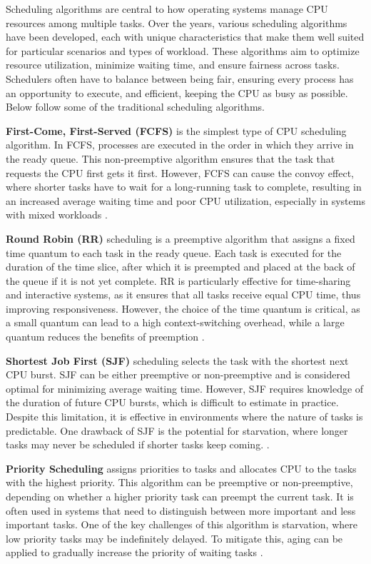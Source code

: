 Scheduling algorithms are central to how operating systems manage CPU resources among multiple tasks. Over the years, various scheduling algorithms have been developed, each with unique characteristics that make them well suited for particular scenarios and types of workload. These algorithms aim to optimize resource utilization, minimize waiting time, and ensure fairness across tasks. Schedulers often have to balance between being fair, ensuring every process has an opportunity to execute, and efficient, keeping the CPU as busy as possible. Below follow some of the traditional scheduling algorithms.

\textbf{First-Come, First-Served (FCFS)} is the simplest type of CPU scheduling algorithm. In FCFS, processes are executed in the order in which they arrive in the ready queue. This non-preemptive algorithm ensures that the task that requests the CPU first gets it first. However, FCFS can cause the convoy effect, where shorter tasks have to wait for a long-running task to complete, resulting in an increased average waiting time and poor CPU utilization, especially in systems with mixed workloads \cite{silberschatz2018, tanenbaum2015}.

\textbf{Round Robin (RR)} scheduling is a preemptive algorithm that assigns a fixed time quantum to each task in the ready queue. Each task is executed for the duration of the time slice, after which it is preempted and placed at the back of the queue if it is not yet complete. RR is particularly effective for time-sharing and interactive systems, as it ensures that all tasks receive equal CPU time, thus improving responsiveness. However, the choice of the time quantum is critical, as a small quantum can lead to a high context-switching overhead, while a large quantum reduces the benefits of preemption \cite{silberschatz2018,padallan2023}.

\textbf{Shortest Job First (SJF)} scheduling selects the task with the shortest next CPU burst. SJF can be either preemptive or non-preemptive and is considered optimal for minimizing average waiting time. However, SJF requires knowledge of the duration of future CPU bursts, which is difficult to estimate in practice. Despite this limitation, it is effective in environments where the nature of tasks is predictable. One drawback of SJF is the potential for starvation, where longer tasks may never be scheduled if shorter tasks keep coming. \cite{tanenbaum2015, padallan2023}.

\textbf{Priority Scheduling} assigns priorities to tasks and allocates CPU to the tasks with the highest priority. This algorithm can be preemptive or non-preemptive, depending on whether a higher priority task can preempt the current task. It is often used in systems that need to distinguish between more important and less important tasks. One of the key challenges of this algorithm is starvation, where low priority tasks may be indefinitely delayed. To mitigate this, aging can be applied to gradually increase the priority of waiting tasks \cite{chakraborty2024, tanenbaum2015}.

